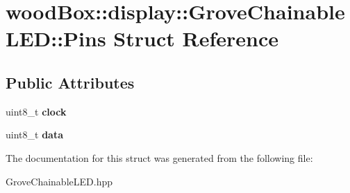 \hypertarget{structwood_box_1_1display_1_1_grove_chainable_l_e_d_1_1_pins}{}\section{wood\+Box\+:\+:display\+:\+:Grove\+Chainable\+L\+ED\+:\+:Pins Struct Reference}
\label{structwood_box_1_1display_1_1_grove_chainable_l_e_d_1_1_pins}
\subsection*{Public Attributes}
\begin{DoxyCompactItemize}
\item 
\mbox{\label{structwood_box_1_1display_1_1_grove_chainable_l_e_d_1_1_pins_a6cd497a670cf643e24c162c028ba437d}} 
uint8\+\_\+t {\bfseries clock}
\item 
\mbox{\label{structwood_box_1_1display_1_1_grove_chainable_l_e_d_1_1_pins_ad2d837c604afe7978b05e8fa4654e9b4}} 
uint8\+\_\+t {\bfseries data}
\end{DoxyCompactItemize}


The documentation for this struct was generated from the following file\+:\begin{DoxyCompactItemize}
\item 
Grove\+Chainable\+L\+E\+D.\+hpp\end{DoxyCompactItemize}
